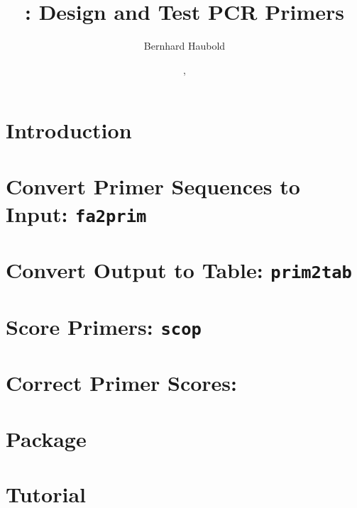 \documentclass[a4paper]{report}
\begin{document}
\pagestyle{noweb}

\title{: Design and Test PCR Primers}
\author{Bernhard Haubold}
\date{\!\!, }
\maketitle

\tableofcontents

\chapter{Introduction}

\chapter{Convert Primer Sequences to  Input: \texttt{fa2prim}}

\chapter{Convert  Output to Table: \texttt{prim2tab}}

\chapter{Score Primers: \texttt{scop}}

\chapter{Correct Primer Scores: }

\chapter{Package }

\chapter{Tutorial}



\end{document}
